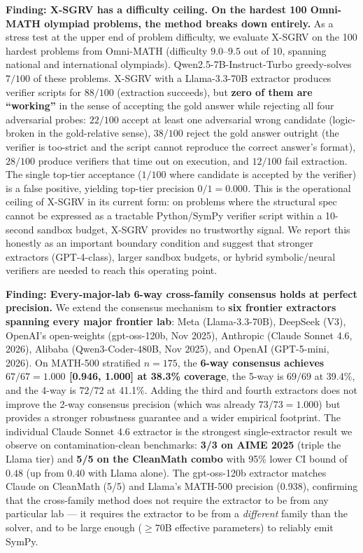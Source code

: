 \documentclass{article}
\begin{document}
\textbf{Finding: X-SGRV has a difficulty ceiling. On the hardest 100 Omni-MATH olympiad problems, the method breaks down entirely.} As a stress test at the upper end of problem difficulty, we evaluate X-SGRV on the 100 hardest problems from Omni-MATH \citep{omnimath2024} (difficulty $9.0$--$9.5$ out of $10$, spanning national and international olympiads). Qwen2.5-7B-Instruct-Turbo greedy-solves $7/100$ of these problems. X-SGRV with a Llama-3.3-70B extractor produces verifier scripts for $88/100$ (extraction succeeds), but \textbf{zero of them are ``working''} in the sense of accepting the gold answer while rejecting all four adversarial probes: $22/100$ accept at least one adversarial wrong candidate (logic-broken in the gold-relative sense), $38/100$ reject the gold answer outright (the verifier is too-strict and the script cannot reproduce the correct answer's format), $28/100$ produce verifiers that time out on execution, and $12/100$ fail extraction. The single top-tier acceptance ($1/100$ where candidate is accepted by the verifier) is a false positive, yielding top-tier precision $0/1 = 0.000$. This is the operational ceiling of X-SGRV in its current form: on problems where the structural spec cannot be expressed as a tractable Python/SymPy verifier script within a 10-second sandbox budget, X-SGRV provides no trustworthy signal. We report this honestly as an important boundary condition and suggest that stronger extractors (GPT-4-class), larger sandbox budgets, or hybrid symbolic/neural verifiers are needed to reach this operating point.

\textbf{Finding: Every-major-lab 6-way cross-family consensus holds at perfect precision.} We extend the consensus mechanism to \textbf{six frontier extractors spanning every major frontier lab}: Meta (Llama-3.3-70B), DeepSeek (V3), OpenAI's open-weights (gpt-oss-120b, Nov 2025), Anthropic (Claude Sonnet 4.6, 2026), Alibaba (Qwen3-Coder-480B, Nov 2025), and OpenAI (GPT-5-mini, 2026). On MATH-500 stratified $n{=}175$, the \textbf{6-way consensus achieves $67/67 = 1.000$ [0.946, 1.000] at 38.3\% coverage}, the 5-way is $69/69$ at 39.4\%, and the 4-way is $72/72$ at 41.1\%. Adding the third and fourth extractors does not improve the 2-way consensus precision (which was already $73/73 = 1.000$) but provides a stronger robustness guarantee and a wider empirical footprint. The individual Claude Sonnet 4.6 extractor is the strongest single-extractor result we observe on contamination-clean benchmarks: \textbf{3/3 on AIME 2025} (triple the Llama tier) and \textbf{5/5 on the CleanMath combo} with 95\% lower CI bound of $0.48$ (up from $0.40$ with Llama alone). The gpt-oss-120b extractor matches Claude on CleanMath (5/5) and Llama's MATH-500 precision (0.938), confirming that the cross-family method does not require the extractor to be from any particular lab --- it requires the extractor to be from a \emph{different} family than the solver, and to be large enough ($\ge 70$B effective parameters) to reliably emit SymPy.
\end{document}
